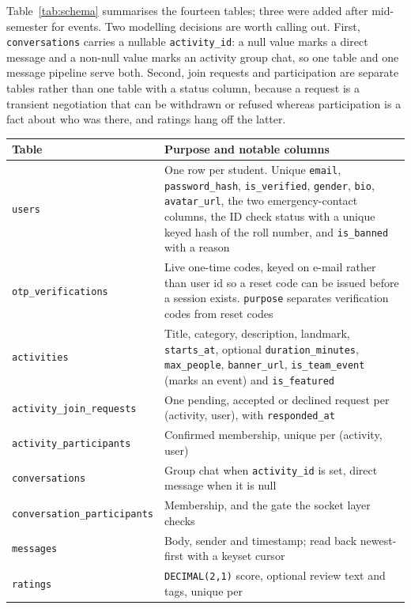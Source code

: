 \documentclass{tietreport}
\begin{document}
Table~\ref{tab:schema} summarises the fourteen tables; three were added after mid-semester for events. Two modelling decisions are worth
calling out. First, \texttt{conversations} carries a nullable \texttt{activity\_id}:
a null value marks a direct message and a non-null value marks an activity group chat,
so one table and one message pipeline serve both. Second, join requests and
participation are separate tables rather than one table with a status column, because
a request is a transient negotiation that can be withdrawn or refused whereas
participation is a fact about who was there, and ratings hang off the latter.

\begin{table}[htbp]
\centering
\begin{tabular}{|L{4.9cm}|L{6.6cm}|}
\hline
\textbf{Table} & \textbf{Purpose and notable columns} \\
\hline
\texttt{users} & One row per student. Unique \texttt{email}, \texttt{password\_hash},
\texttt{is\_verified}, \texttt{gender}, \texttt{bio}, \texttt{avatar\_url}, the two
emergency-contact columns, the ID check status with a unique keyed hash of the roll
number, and \texttt{is\_banned} with a reason \\
\hline
\texttt{otp\_verifications} & Live one-time codes, keyed on e-mail rather than user id
so a reset code can be issued before a session exists. \texttt{purpose} separates
verification codes from reset codes \\
\hline
\texttt{activities} & Title, category, description, landmark, \texttt{starts\_at},
optional \texttt{duration\_minutes}, \texttt{max\_people}, \texttt{banner\_url},
\texttt{is\_team\_event} (marks an event) and \texttt{is\_featured} \\
\hline
\texttt{activity\_join\_requests} & One pending, accepted or declined request per
(activity, user), with \texttt{responded\_at} \\
\hline
\texttt{activity\_participants} & Confirmed membership, unique per (activity, user) \\
\hline
\texttt{conversations} & Group chat when \texttt{activity\_id} is set, direct message
when it is null \\
\hline
\texttt{conversation\_\allowbreak participants} & Membership, and the gate the socket layer checks \\
\hline
\texttt{messages} & Body, sender and timestamp; read back newest-first with a
keyset cursor \\
\hline
\texttt{ratings} & \texttt{DECIMAL(2,1)} score, optional review text and tags, unique per

\end{tabular}
\end{table}
\end{document}
